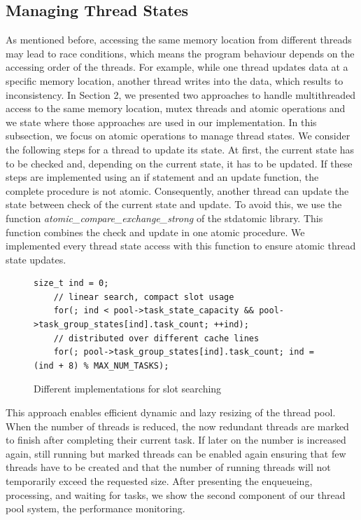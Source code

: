 \documentclass[conference]{IEEEtran}
\begin{document}
\subsection{Managing Thread States}
As mentioned before, accessing the same memory location from different threads may lead to race conditions, which means the program behaviour depends on the accessing order of the threads. For example, while one thread updates data at a specific memory location, another thread writes into the data, which results to inconsistency. In Section 2, we presented two approaches to handle multithreaded access to the same memory location, mutex threads and atomic operations and we state where those approaches are used in our implementation. In this subsection, we focus on atomic operations to manage thread states. We consider the following steps for a thread to update its state. At first, the current state has to be checked and, depending on the current state, it has to be updated. If these steps are implemented using an if statement and an update function, the complete procedure is not atomic. Consequently, another thread can update the state between check of the current state and update. To avoid this, we use the function \emph{atomic\_compare\_exchange\_strong} \cite{atomicstrong} of the stdatomic library. This function combines the check and update in one atomic procedure. We implemented every thread state access with this function to ensure atomic thread state updates. 

\begin{figure}
	\begin{lstlisting}[style=CStyle]
	size_t ind = 0;
	// linear search, compact slot usage
	for(; ind < pool->task_state_capacity && pool->task_group_states[ind].task_count; ++ind);
	// distributed over different cache lines
	for(; pool->task_group_states[ind].task_count; ind = (ind + 8) % MAX_NUM_TASKS);
	\end{lstlisting}
	\caption{Different implementations for slot searching}
	\label{fig10}
\end{figure}

This approach enables efficient dynamic and lazy resizing of the thread pool. When the number of threads is reduced, the now redundant threads are marked to finish after completing their current task. If later on the number is increased again, still running but marked threads can be enabled again ensuring that few threads have to be created and that the number of running threads will not temporarily exceed the requested size. 
 After presenting the enqueueing, processing, and waiting for tasks, we show the second component of our thread pool system, the performance monitoring.
\end{document}
